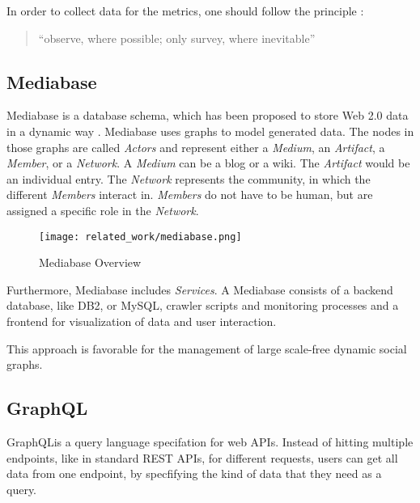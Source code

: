 In order to collect data for the metrics, one should follow the principle \cite{RKJa15}:
\begin{quotation}
	``observe, where possible; only survey,	where inevitable''
\end{quotation}

\subsection{Mediabase}
Mediabase is a database schema, which has been proposed to store Web 2.0 data in a dynamic way \cite{KlPe08}. Mediabase uses graphs to model generated data. The nodes in those graphs are called \emph{Actors} and represent either a \emph{ Medium}, an \emph{Artifact}, a \emph{Member}, or a \emph{Network}. A \emph{ Medium} can be a blog or a wiki. The \emph{Artifact} would be an individual entry. The \emph{Network} represents the community, in which the different \emph{Members} interact in. \emph{Members} do not have to be human, but are assigned a specific role in the \emph{Network}.
\begin{figure}
	\centering
	\texttt{[image: related\_work/mediabase.png]}
	\caption{Mediabase Overview \cite{Klam10e}}
\end{figure}
Furthermore, Mediabase includes \emph{Services}. A Mediabase consists of a backend database, like DB2, or MySQL, crawler scripts and monitoring processes and a frontend for visualization of data  and user interaction.

This approach is favorable for the management of large scale-free dynamic social graphs.

\subsection{GraphQL}
GraphQL\footnotemark is a query language specifation for web APIs. Instead of hitting multiple endpoints, like in standard REST APIs, for different requests, users can get all data from one endpoint, by specfifying the kind of data that they need as a query.


